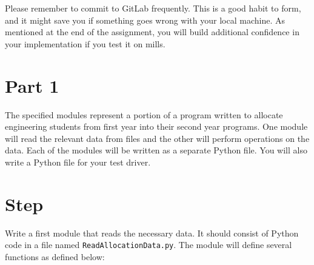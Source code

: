 \documentclass[12pt]{article}
\newcounter{stepnum}
\begin{document}
Please remember to commit to GitLab frequently.  This is a good habit to form,
and it might save you if something goes wrong with your local machine.  As
mentioned at the end of the assignment, you will build additional confidence in
your implementation if you test it on mills.

\section*{Part 1}

The specified modules represent a portion of a program written to allocate
engineering students from first year into their second year programs.  One
module will read the relevant data from files and the other will perform
operations on the data.  Each of the modules will be written as a separate
Python file.  You will also write a Python file for your test driver.

\section *{Step  \thestepnum}

Write a first module that reads the necessary data.  It should consist of Python
code in a file named {\tt ReadAllocationData.py}.  The module will define
several functions as defined below:
\end{document}
